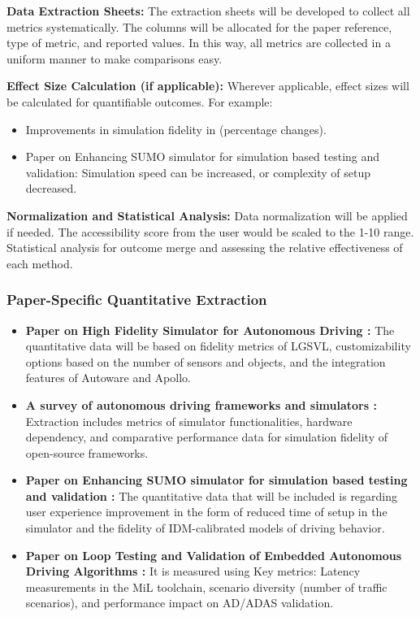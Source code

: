 \documentclass[lettersize,journal]{IEEEtran}
\begin{document}
\textbf{Data Extraction Sheets:} The extraction sheets will be developed to collect all metrics systematically. The columns will be allocated for the paper reference, type of metric, and reported values. In this way, all metrics are collected in a uniform manner to make comparisons easy.

\textbf{Effect Size Calculation (if applicable):} Wherever applicable, effect sizes will be calculated for quantifiable outcomes. For example:
\begin{itemize}
    \item Improvements in simulation fidelity in \cite{ref55} (percentage changes).
    \item Paper on Enhancing SUMO simulator for simulation based testing and validation\cite{ref54}: Simulation speed can be increased, or complexity of setup decreased.
\end{itemize}

\textbf{Normalization and Statistical Analysis:} Data normalization will be applied if needed. The accessibility score from the user would be scaled to the 1-10 range. Statistical analysis for outcome merge and assessing the relative effectiveness of each method.

\subsubsection{Paper-Specific Quantitative Extraction}
\begin{itemize}
    \item \textbf{Paper on  High Fidelity Simulator for Autonomous Driving \cite{ref51}:} The quantitative data will be based on fidelity metrics of LGSVL, customizability options based on the number of sensors and objects, and the integration features of Autoware and Apollo.
    \item \textbf{A survey of autonomous driving frameworks and simulators \cite{ref52}:} Extraction includes metrics of simulator functionalities, hardware dependency, and comparative performance data for simulation fidelity of open-source frameworks.
    \item \textbf{Paper on Enhancing SUMO simulator for simulation based testing and validation \cite{ref54}:} The quantitative data that will be included is regarding user experience improvement in the form of reduced time of setup in the simulator and the fidelity of IDM-calibrated models of driving behavior.
    \item \textbf{Paper on Loop Testing and Validation of Embedded Autonomous Driving Algorithms \cite{ref55}:} It is measured using Key metrics: Latency measurements in the MiL toolchain, scenario diversity (number of traffic scenarios), and performance impact on AD/ADAS validation.
\end{itemize}
\end{document}
